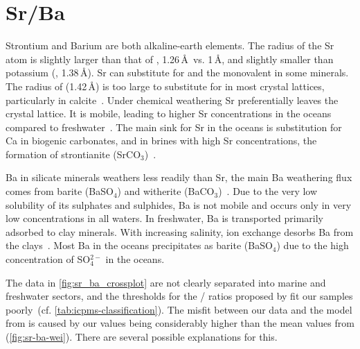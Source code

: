 \section{Sr/Ba}

Strontium and Barium are both alkaline-earth elements.
The radius of the Sr atom is slightly larger than that of , 1.26\,\AA\ vs. 1\,\AA, and slightly smaller 
than potassium (, 1.38\,\AA). Sr can
substitute for  and the monovalent  in some minerals. The radius 
of  (1.42\,\AA) is too large to substitute
for  in most crystal lattices, particularly in calcite~\parencite{housecroft-chemistry}.
Under chemical weathering Sr preferentially leaves the crystal lattice. It is
mobile, leading to higher Sr concentrations in the oceans compared to freshwater~\parencite{brand-veizer-1980}.
The main sink for Sr in the oceans is substitution for Ca in biogenic carbonates, and in brines with high Sr concentrations,
the formation of strontianite (SrCO$_3$)~\parencite{banner-hanson-1990,wei-2020}.

Ba in silicate minerals weathers less readily than Sr, the main Ba weathering flux comes from barite (BaSO$_4$)
and witherite (BaCO$_3$)~\parencite{wei-2020}.
Due to the very low solubility of its sulphates and sulphides, Ba is not mobile and occurs only in very low 
concentrations in all waters. In freshwater, Ba is transported primarily 
adsorbed to clay minerals. With increasing salinity, ion exchange desorbs Ba from the clays~\parencite{wei-2020}.
Most Ba in the oceans precipitates as
barite (BaSO$_4$) due to the high concentration of SO$_{4}^{2-}$ in the oceans.

The data in \cref{fig:sr_ba_crossplot} are not clearly
separated into marine and freshwater sectors, and the thresholds for the /
ratios proposed by \textcite{wei-2020} fit our samples poorly~(cf. \cref{tab:icpms-classification}).
The misfit between our data and the model from \textcite{wei-2020} is caused by our  values being
considerably
higher than the mean values from \textcite{wei-2020} (\cref{fig:sr-ba-wei}). There are several possible
explanations for this. 

\begin{table}[b!]
    \centering
    \caption{Classification of our samples into marine (M), brackish (B) and freshwater (F) according to different methods.
    Where applicable we compare our data against the classification criteria of \textcite{wei-2020}. 
    Geological map classification based on \textcite{Linth_Map}.}\label{tab:icpms-classification}
    
\end{table}

